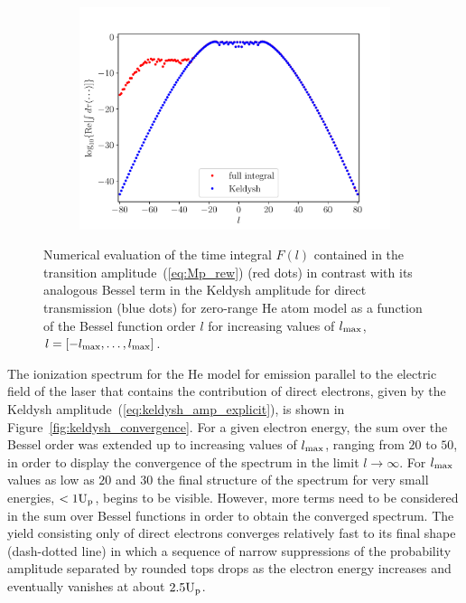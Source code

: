 \begin{figure}
\begin{subfigure}[b]{0.33\linewidth}
  \includegraphics[width=\textwidth]{figures/ch_ATI_SFA/He/l80n512WP50PG25MR35vsKeldysh.pdf}
\end{subfigure}
\caption{Numerical evaluation of the time integral $F(l)$ contained in
  the transition amplitude~(\ref{eq:Mp_rew}) (red dots) in contrast
  with its analogous Bessel term in the Keldysh amplitude for direct
  transmission (blue dots) for zero-range He atom model as a function
  of the Bessel function order $l$ for increasing values of
  $l_{\rm{max}}$, $l=[ -l_{\rm{max}} , \dots, l_{\rm{max}}]$.}
  \label{fig:integral_keldysh}
\end{figure}



The ionization spectrum for the He model for emission parallel to the
electric field of the laser that contains the contribution of direct
electrons, given by the Keldysh
amplitude~(\ref{eq:keldysh_amp_explicit}), is shown in
Figure~\ref{fig:keldysh_convergence}. For a given electron energy, the
sum over the Bessel order was extended up to increasing values of
$l_{\rm{max}}$, ranging from $20$ to $50$, in order to display the
convergence of the spectrum in the limit $l\to\infty$. For
$l_{\rm{max}}$ values as low as $20$ and $30$ the final structure of
the spectrum for very small energies, $<1 \rm{U_{p}}$, begins to be
visible. However, more terms need to be considered in the sum over
Bessel functions in order to obtain the converged spectrum. The yield
consisting only of direct electrons converges relatively fast to its
final shape (dash-dotted line) in which a sequence of narrow
suppressions of the probability amplitude separated by rounded tops
drops as the electron energy increases and eventually vanishes at
about $2.5\rm{U_{p}}$.

